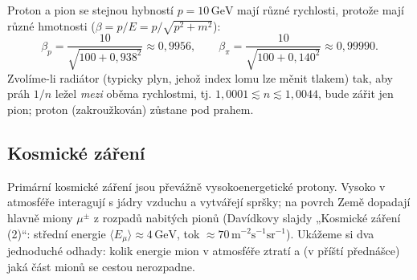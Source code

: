 \begin{priklad}
Proton a pion se stejnou hybností \(p = 10\,\text{GeV}\) mají různé rychlosti,
protože mají různé hmotnosti (\(\beta = p/E = p/\sqrt{p^2+m^2}\)):
\[
  \beta_p = \frac{10}{\sqrt{100 + 0{,}938^2}} \approx 0{,}9956, \qquad
  \beta_\pi = \frac{10}{\sqrt{100 + 0{,}140^2}} \approx 0{,}99990 .
\]
Zvolíme-li radiátor (typicky plyn, jehož index lomu lze měnit tlakem) tak,
aby práh \(1/n\) ležel \emph{mezi} oběma rychlostmi, tj.
\(1{,}0001 \lesssim n \lesssim 1{,}0044\), bude zářit jen pion; proton
(zakroužkován) zůstane pod prahem.

\begin{center}
\end{center}
\end{priklad}

\subsection{Kosmické záření}

Primární kosmické záření jsou převážně vysokoenergetické protony. Vysoko
v atmosféře interagují s jádry vzduchu a vytvářejí spršky; na povrch Země
dopadají hlavně miony \(\mu^\pm\) z rozpadů nabitých pionů (Davídkovy slajdy
„Kosmické záření (2)``: střední energie \(\langle E_\mu\rangle \approx 4\,\text{GeV}\),
tok \(\approx 70\,\text{m}^{-2}\text{s}^{-1}\text{sr}^{-1}\)). Ukážeme si dva
jednoduché odhady: kolik energie mion v atmosféře ztratí a (v příští přednášce)
jaká část mionů se cestou nerozpadne.

